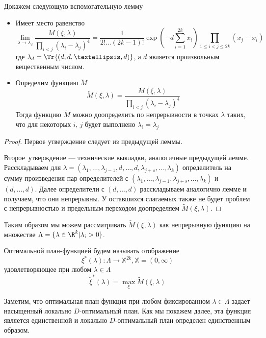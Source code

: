 Докажем следующую вспомогательную лемму
\begin{lem}
\begin{itemize}
\item
Имеет место равенство
\begin{equation}
\lim \limits_{\lambda \rightarrow \lambda_d} \frac{M(\xi, \lambda)}{\prod\limits_{i < j}(\lambda_i - \lambda_j)^4} = \frac{1}{2!…(2k-1)!}\exp\left(-d\sum\limits_{i=1}^{2k}x_i\right)\prod\limits_{1 \leq i < j \leq 2k}(x_j - x_i)
\end{equation}
где $\lambda_d = \Tr{(d, d,…,d)}$, а $d$ является произвольным вещественным числом.

\item Определим функцию $\tilde{M}$
\begin{equation}
\tilde{M}(\xi, \lambda) = \frac{M(\xi, \lambda)}{\prod \limits_{i < j} (\lambda_i - \lambda_j)^4}
\end{equation}
Тогда функцию $\tilde{M}$ можно доопределить по непрерывности в точках $\lambda$  таких, что для некоторых $i$, $j$ будет выполнено $\lambda_i = \lambda_j$ 
\end{itemize}
\end{lem}
\begin{proof}
Первое утверждение следует из предыдущей леммы.

Второе утверждение — технические выкладки, аналогичные предыдущей лемме. Расскладываем для $\lambda = (\lambda_1, …, \lambda_{j-1}, d, …, d, \lambda_{j+s}, …,\lambda_{k})$ определитель на сумму произведения пар определителей с $(\lambda_1, …, \lambda_{j-1},  \lambda_{j+s}, …,\lambda_{k})$ и $(d, …, d)$. Далее определители с $(d, …, d)$ расскладываем аналогично лемме и получаем, что они непрерывны. У оставшихся слагаемых также не будет проблем с непрерывностью и предельным переходом доопределяем $\tilde{M}(\xi, \lambda)$.
\end{proof}


Таким образом мы можем рассматривать $\tilde{M}(\xi, \lambda)$ как непрерывную функцию на множестве $\Lambda = \{ \lambda \in \R^{k} | \lambda_i > 0\}$. 
\begin{dfn}
Оптимальной план-функцией будем называть отображение 
$$\xi^{*}(\lambda): \Lambda \rightarrow \mathbb{X}^{2k}, \mathbb{X} = (0, \infty)$$
удовлетворяющее при любом $\lambda \in \Lambda$
$$\tilde{\xi}^{*}(\lambda) = \max\limits_{\xi}\tilde{M}(\xi, \lambda)$$
\end{dfn}
Заметим, что оптимальная план-функция при любом фиксированном $\lambda \in \Lambda$  задает насыщенный локально $D$-оптимальный план. Как мы покажем далее, эта функция является единственной и локально $D$-оптимальный план определен единственным образом. 

